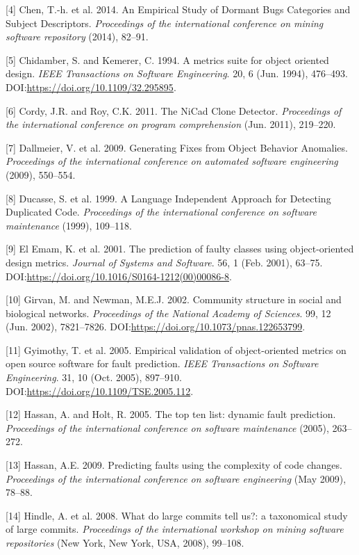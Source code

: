 \documentclass[sigconf]{acmart}
\begin{document}
[4] Chen, T.-h. et al. 2014. An Empirical Study of Dormant Bugs
Categories and Subject Descriptors. \emph{Proceedings of the
international conference on mining software repository} (2014), 82--91.


[5] Chidamber, S. and Kemerer, C. 1994. A metrics suite for object
oriented design. \emph{IEEE Transactions on Software Engineering}. 20, 6
(Jun. 1994), 476--493. DOI:\url{https://doi.org/10.1109/32.295895}.


[6] Cordy, J.R. and Roy, C.K. 2011. The NiCad Clone Detector.
\emph{Proceedings of the international conference on program
comprehension} (Jun. 2011), 219--220.


[7] Dallmeier, V. et al. 2009. Generating Fixes from Object Behavior
Anomalies. \emph{Proceedings of the international conference on
automated software engineering} (2009), 550--554.


[8] Ducasse, S. et al. 1999. A Language Independent Approach for
Detecting Duplicated Code. \emph{Proceedings of the international
conference on software maintenance} (1999), 109--118.


[9] El Emam, K. et al. 2001. The prediction of faulty classes using
object-oriented design metrics. \emph{Journal of Systems and Software}.
56, 1 (Feb. 2001), 63--75.
DOI:\url{https://doi.org/10.1016/S0164-1212(00)00086-8}.


[10] Girvan, M. and Newman, M.E.J. 2002. Community structure in
social and biological networks. \emph{Proceedings of the National
Academy of Sciences}. 99, 12 (Jun. 2002), 7821--7826.
DOI:\url{https://doi.org/10.1073/pnas.122653799}.


[11] Gyimothy, T. et al. 2005. Empirical validation of
object-oriented metrics on open source software for fault prediction.
\emph{IEEE Transactions on Software Engineering}. 31, 10 (Oct. 2005),
897--910. DOI:\url{https://doi.org/10.1109/TSE.2005.112}.


[12] Hassan, A. and Holt, R. 2005. The top ten list: dynamic fault
prediction. \emph{Proceedings of the international conference on
software maintenance} (2005), 263--272.


[13] Hassan, A.E. 2009. Predicting faults using the complexity of
code changes. \emph{Proceedings of the international conference on
software engineering} (May 2009), 78--88.


[14] Hindle, A. et al. 2008. What do large commits tell us?: a
taxonomical study of large commits. \emph{Proceedings of the
international workshop on mining software repositories} (New York, New
York, USA, 2008), 99--108.
\end{document}
